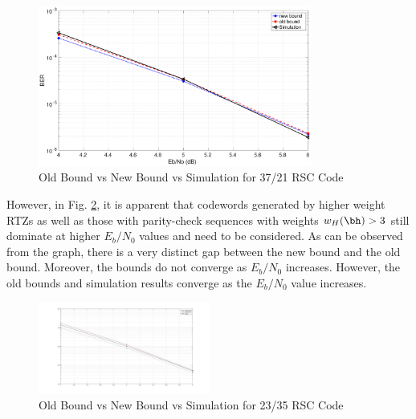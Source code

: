 \begin{figure}[h!]
\centering
		\includegraphics[width=0.8\textwidth]{./Images/RSC_37_21_v2.eps}
		\caption{Old Bound vs New Bound vs Simulation for 37/21 RSC Code}
		\label{simFig2}
		\end{figure}
However, in Fig. \ref{simFig3}, it is apparent that codewords generated by higher weight RTZs as well as those with parity-check sequences with weights $w_H(\bh)>3$ still dominate at higher $E_b/N_0$ values and need to be considered. As can be observed from the graph, there is a very distinct gap between the new bound and the old bound. Moreover, the bounds do not converge as $E_b/N_0$ increases. However, the old bounds and simulation results converge as the $E_b/N_0$ value increases. 

\begin{figure}[h!]
\centering
		\includegraphics[width=0.5\textwidth]{./Images/RSC_23_35_v3.jpg}
		\caption{Old Bound vs New Bound vs Simulation for 23/35 RSC Code}
		\label{simFig3}
		\end{figure}
		

